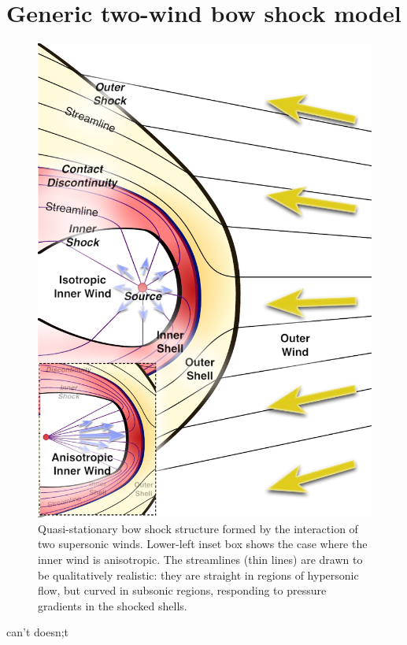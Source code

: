 \section{Generic two-wind bow shock model}
\label{sec:generic-model}

\begin{figure}
  \includegraphics[width=\linewidth]{figs/generic-bowshock}
  \caption{Quasi-stationary bow shock structure formed by the
    interaction of two supersonic winds.  Lower-left inset box shows
    the case where the inner wind is anisotropic. The streamlines
    (thin lines) are drawn to be qualitatively realistic: they
    are straight in regions of hypersonic flow, but curved in subsonic
    regions, responding to pressure gradients in the shocked shells.}
\label{fig:2-winds}
\end{figure}
can't doesn;t 
